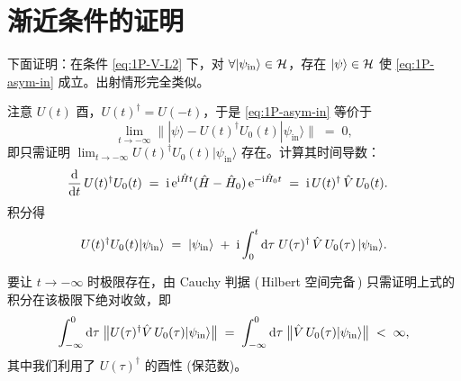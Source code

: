 \section{渐近条件的证明}
\label{sec:1P-proofAsym}

下面证明：在条件 \eqref{eq:1P-V-L2} 下，对 $\forall |\psi_{\text{in}}
\rangle\in\mathcal{H}$，存在 $|\psi\rangle\in\mathcal{H}$ 使
\eqref{eq:1P-asym-in} 成立。出射情形完全类似。

\begin{proof*}
注意 $U(t)$ 酉，$U(t)^{\dagger}=U(-t)$，于是 \eqref{eq:1P-asym-in} 等价于
\begin{equation}
  \lim_{t\to-\infty}\bigl\| |\psi\rangle - U(t)^{\dagger}U_0(t)|\psi_{\text{in}}\rangle \bigr\|
  \;=\; 0,
  \label{eq:1P-asym-equiv}
\end{equation}
即只需证明 $\lim_{t\to-\infty} U(t)^{\dagger}U_0(t)|\psi_{\text{in}}\rangle$
存在。计算其时间导数：
\begin{align}
  \frac{\mathrm{d}}{\mathrm{d} t}\,U(t)^{\dagger}U_0(t)
  \;&=\; \mathrm{i}\,\mathrm{e}^{\mathrm{i} \hat{H} t}(\hat{H}-\hat{H}_0)\,\mathrm{e}^{-\mathrm{i} \hat{H}_0 t}
  \;=\; \mathrm{i}\,U(t)^{\dagger}\,\hat{V}\,U_0(t).
  \label{eq:1P-derivOmega}
\end{align}
积分得
\begin{equation}
  U(t)^{\dagger}U_0(t)|\psi_{\text{in}}\rangle
  \;=\; |\psi_{\text{in}}\rangle
  \;+\; \mathrm{i}\int_0^{t} \mathrm{d}\tau\; U(\tau)^{\dagger}\,\hat{V}\,U_0(\tau)\,|\psi_{\text{in}}\rangle.
  \label{eq:1P-Omega-integral}
\end{equation}

要让 $t\to-\infty$ 时极限存在，由 Cauchy 判据 (\,Hilbert 空间完备\,)
只需证明上式的积分在该极限下绝对收敛，即
\begin{equation}
  \int_{-\infty}^{0} \mathrm{d}\tau \; \bigl\| U(\tau)^{\dagger}\hat{V}\,U_0(\tau)|\psi_{\text{in}}\rangle\bigr\|
  \;=\; \int_{-\infty}^{0} \mathrm{d}\tau \;\bigl\| \hat{V}\,U_0(\tau)|\psi_{\text{in}}\rangle\bigr\|
  \;<\;\infty,
  \label{eq:1P-int-cond}
\end{equation}
其中我们利用了 $U(\tau)^\dagger$ 的酉性 (保范数)。


\end{proof*}
